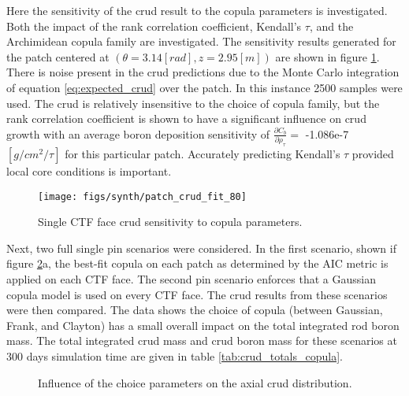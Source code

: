 Here the sensitivity of the crud result to the copula parameters is investigated.  Both the impact of the rank correlation coefficient, Kendall's $\tau$, and the Archimidean copula family are investigated.  The sensitivity results generated for the patch centered at $(\theta=3.14[rad], z=2.95[m])$ are shown in figure \ref{fig:patchcrudfit80}.  There is noise present in the crud predictions due to the Monte Carlo integration of equation \ref{eq:expected_crud} over the patch.  In this instance 2500 samples were used.  The crud is relatively insensitive to the choice of copula family, but the rank correlation coefficient is shown to have a significant influence on crud growth with an average boron deposition sensitivity of $\frac{\partial C_b}{\partial \rho_\tau} =$ -1.086e-7 $[g/cm^2/\tau]$ for this particular patch.  Accurately predicting Kendall's $\tau$ provided local core conditions is important.

\begin{figure}[H]
    \centering
    \texttt{[image: figs/synth/patch\_crud\_fit\_80]}
    \caption{Single CTF face crud sensitivity to copula parameters.}
    \label{fig:patchcrudfit80}
\end{figure}

Next, two full single pin scenarios were considered. In the first scenario, shown if figure \ref{fig:crud_copula_fam_sensi}a, the best-fit copula on each patch as determined by the AIC metric is applied on each CTF face.  The second pin scenario enforces that a Gaussian copula model is used on every CTF face.  The crud results from these scenarios were then compared.  The data shows the choice of copula (between Gaussian, Frank, and Clayton) has a small overall impact on the total integrated rod boron mass.   The total integrated crud mass and crud boron mass for these scenarios at 300 days simulation time are given in table \ref{tab:crud_totals_copula}.

\begin{figure}[H]%
    \centering
    \qquad
    \caption[]{Influence of the choice parameters on the axial crud distribution.}%
    \label{fig:crud_copula_fam_sensi}%
\end{figure}


